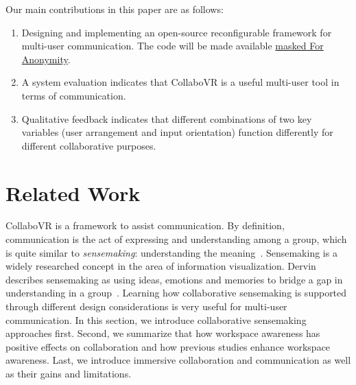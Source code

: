 \documentclass{sigchi}
\begin{document}
Our main contributions in this paper are as follows:
\begin{enumerate}
    \item Designing and implementing an open-source reconfigurable framework for multi-user communication. The code will be made available \url{masked For Anonymity}.
    \item A system evaluation indicates that CollaboVR is a useful multi-user tool in terms of communication.
    \item Qualitative feedback indicates that different combinations of two key variables (user arrangement and input orientation) function differently for different collaborative purposes.
\end{enumerate}


\section{Related Work}
CollaboVR is a framework to assist communication. By definition, communication is the act of expressing and understanding among a group, which is quite similar to \textit{sensemaking}: understanding the meaning~\cite{paul2009understanding}. Sensemaking is a widely researched concept in the area of information visualization. Dervin describes sensemaking as using ideas, emotions and memories to bridge a gap in understanding in a group~\cite{dervin1992mind}. Learning how collaborative sensemaking is supported through different design considerations is very useful for multi-user communication. In this section, we introduce collaborative sensemaking approaches first. Second, we summarize that how workspace awareness has positive effects on collaboration and how previous studies enhance workspace awareness. Last, we introduce immersive collaboration and communication as well as their gains and limitations.
\end{document}
